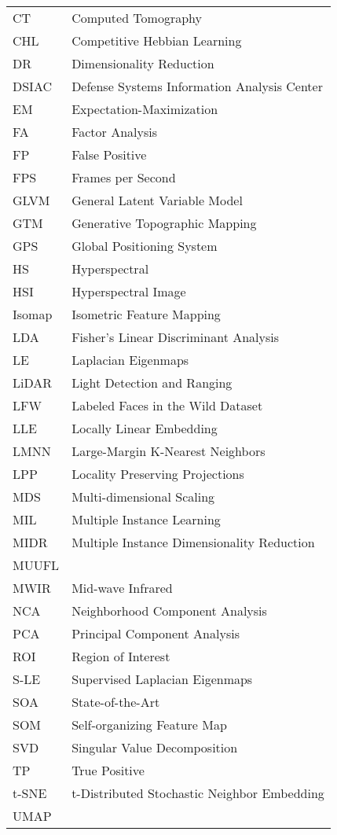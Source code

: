 \begin{tabular}{l p{5in}} %

CT & Computed Tomography\\
CHL & Competitive Hebbian Learning\\
DR & Dimensionality Reduction\\
DSIAC & Defense Systems Information Analysis Center\\
EM & Expectation-Maximization\\
FA & Factor Analysis\\
FP & False Positive\\ 
FPS & Frames per Second\\
GLVM & General Latent Variable Model\\
GTM & Generative Topographic Mapping\\
GPS & Global Positioning System\\
HS & Hyperspectral\\
HSI & Hyperspectral Image\\
Isomap & Isometric Feature Mapping\\
LDA & Fisher's Linear Discriminant Analysis\\
LE & Laplacian Eigenmaps\\
LiDAR & Light Detection and Ranging\\
LFW & Labeled Faces in the Wild Dataset\\
LLE & Locally Linear Embedding\\
LMNN & Large-Margin K-Nearest Neighbors\\
LPP & Locality Preserving Projections\\
MDS & Multi-dimensional Scaling\\
MIL & Multiple Instance Learning\\
MIDR & Multiple Instance Dimensionality Reduction\\
MUUFL & \\
MWIR & Mid-wave Infrared\\
NCA & Neighborhood Component Analysis\\
PCA & Principal Component Analysis\\
ROI & Region of Interest\\
S-LE & Supervised Laplacian Eigenmaps\\
SOA & State-of-the-Art\\
SOM & Self-organizing Feature Map\\
SVD & Singular Value Decomposition\\
TP & True Positive\\
t-SNE & t-Distributed Stochastic Neighbor Embedding\\
UMAP & \\

 \end{tabular}



\doublespacing

